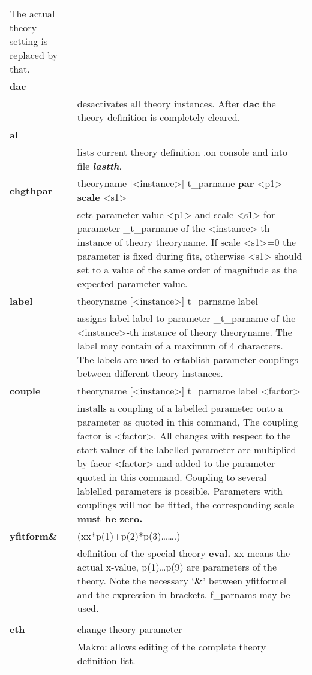 \documentclass[]{article}
\begin{document}
\begin{longtable}[]{@{}ll@{}}
\begin{minipage}[t]{0.47\columnwidth}
The actual theory setting is replaced by that.\strut
\end{minipage}\tabularnewline
\textbf{dac} &\tabularnewline
& desactivates all theory instances. After \textbf{dac} the theory
definition is completely cleared.\tabularnewline
\textbf{al} &\tabularnewline
& lists current theory definition .on console and into file
\emph{\textbf{lastth}}.\tabularnewline
\textbf{chgthpar} & theoryname {[}\textless{}instance\textgreater{}{]}
t\_parname \textbf{par} \textless{}p1\textgreater{} \textbf{scale}
\textless{}s1\textgreater{}\tabularnewline
& sets parameter value \textless{}p1\textgreater{} and scale
\textless{}s1\textgreater{} for parameter \_t\_parname of the
\textless{}instance\textgreater{}-th instance of theory theoryname. If
scale \textless{}s1\textgreater{}=0 the parameter is fixed during fits,
otherwise \textless{}s1\textgreater{} should set to a value of the same
order of magnitude as the expected parameter value.\tabularnewline
\textbf{label} & theoryname {[}\textless{}instance\textgreater{}{]}
t\_parname label\tabularnewline
& assigns label label to parameter \_t\_parname of the
\textless{}instance\textgreater{}-th instance of theory theoryname. The
label may contain of a maximum of 4 characters. The labels are used to
establish parameter couplings between different theory
instances.\tabularnewline
\textbf{couple} & theoryname {[}\textless{}instance\textgreater{}{]}
t\_parname label \textless{}factor\textgreater{}\tabularnewline
& installs a coupling of a labelled parameter onto a parameter as quoted
in this command, The coupling factor is \textless{}factor\textgreater{}.
All changes with respect to the start values of the labelled parameter
are multiplied by facor \textless{}factor\textgreater{} and added to the
parameter quoted in this command. Coupling to several lablelled
parameters is possible. Parameters with couplings will not be fitted,
the corresponding scale \textbf{must be} \textbf{zero.}\tabularnewline
\textbf{yfitform\&} &
(xx*p(1)+p(2)*p(3)\ldots{}\ldots{}.)\tabularnewline
& definition of the special theory \textbf{eval.} xx means the actual
x-value, p(1)\ldots{}p(9) are parameters of the theory. Note the
necessary `\textbf{\&}' between yfitformel and the expression in
brackets. f\_parnams may be used.\tabularnewline
&\tabularnewline
\textbf{cth} & change theory parameter\tabularnewline
\begin{minipage}[t]{0.47\columnwidth}\raggedright
\strut
\end{minipage} & \begin{minipage}[t]{0.47\columnwidth}\raggedright
Makro: allows editing of the complete theory definition list.


\end{minipage}
\end{longtable}
\end{document}
